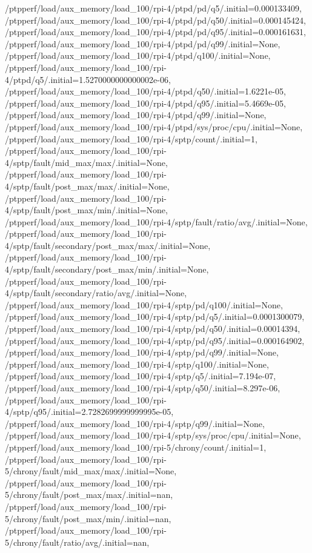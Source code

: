 {    /ptpperf/load/aux_memory/load_100/rpi-4/ptpd/pd/q5/.initial=0.000133409,
    /ptpperf/load/aux_memory/load_100/rpi-4/ptpd/pd/q50/.initial=0.000145424,
    /ptpperf/load/aux_memory/load_100/rpi-4/ptpd/pd/q95/.initial=0.000161631,
    /ptpperf/load/aux_memory/load_100/rpi-4/ptpd/pd/q99/.initial=None,
    /ptpperf/load/aux_memory/load_100/rpi-4/ptpd/q100/.initial=None,
    /ptpperf/load/aux_memory/load_100/rpi-4/ptpd/q5/.initial=1.5270000000000002e-06,
    /ptpperf/load/aux_memory/load_100/rpi-4/ptpd/q50/.initial=1.6221e-05,
    /ptpperf/load/aux_memory/load_100/rpi-4/ptpd/q95/.initial=5.4669e-05,
    /ptpperf/load/aux_memory/load_100/rpi-4/ptpd/q99/.initial=None,
    /ptpperf/load/aux_memory/load_100/rpi-4/ptpd/sys/proc/cpu/.initial=None,
    /ptpperf/load/aux_memory/load_100/rpi-4/sptp/count/.initial=1,
    /ptpperf/load/aux_memory/load_100/rpi-4/sptp/fault/mid_max/max/.initial=None,
    /ptpperf/load/aux_memory/load_100/rpi-4/sptp/fault/post_max/max/.initial=None,
    /ptpperf/load/aux_memory/load_100/rpi-4/sptp/fault/post_max/min/.initial=None,
    /ptpperf/load/aux_memory/load_100/rpi-4/sptp/fault/ratio/avg/.initial=None,
    /ptpperf/load/aux_memory/load_100/rpi-4/sptp/fault/secondary/post_max/max/.initial=None,
    /ptpperf/load/aux_memory/load_100/rpi-4/sptp/fault/secondary/post_max/min/.initial=None,
    /ptpperf/load/aux_memory/load_100/rpi-4/sptp/fault/secondary/ratio/avg/.initial=None,
    /ptpperf/load/aux_memory/load_100/rpi-4/sptp/pd/q100/.initial=None,
    /ptpperf/load/aux_memory/load_100/rpi-4/sptp/pd/q5/.initial=0.0001300079,
    /ptpperf/load/aux_memory/load_100/rpi-4/sptp/pd/q50/.initial=0.00014394,
    /ptpperf/load/aux_memory/load_100/rpi-4/sptp/pd/q95/.initial=0.000164902,
    /ptpperf/load/aux_memory/load_100/rpi-4/sptp/pd/q99/.initial=None,
    /ptpperf/load/aux_memory/load_100/rpi-4/sptp/q100/.initial=None,
    /ptpperf/load/aux_memory/load_100/rpi-4/sptp/q5/.initial=7.194e-07,
    /ptpperf/load/aux_memory/load_100/rpi-4/sptp/q50/.initial=8.297e-06,
    /ptpperf/load/aux_memory/load_100/rpi-4/sptp/q95/.initial=2.7282699999999995e-05,
    /ptpperf/load/aux_memory/load_100/rpi-4/sptp/q99/.initial=None,
    /ptpperf/load/aux_memory/load_100/rpi-4/sptp/sys/proc/cpu/.initial=None,
    /ptpperf/load/aux_memory/load_100/rpi-5/chrony/count/.initial=1,
    /ptpperf/load/aux_memory/load_100/rpi-5/chrony/fault/mid_max/max/.initial=None,
    /ptpperf/load/aux_memory/load_100/rpi-5/chrony/fault/post_max/max/.initial=nan,
    /ptpperf/load/aux_memory/load_100/rpi-5/chrony/fault/post_max/min/.initial=nan,
    /ptpperf/load/aux_memory/load_100/rpi-5/chrony/fault/ratio/avg/.initial=nan,
}
